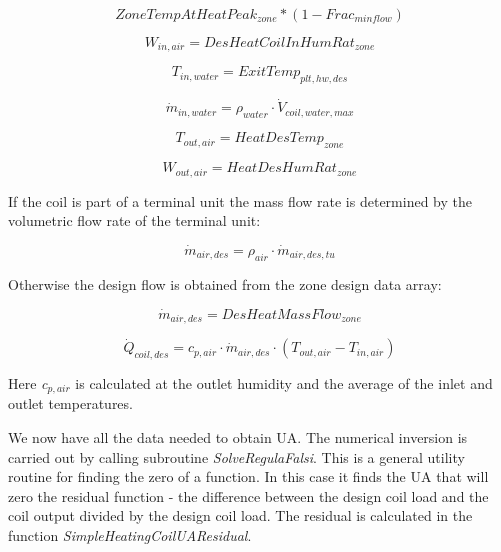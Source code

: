 \begin{equation}
ZoneTempAtHeatPeak_{zone} *(1- Frac_{minflow})
\end{equation}

\begin{equation}
W_{in,air} = DesHeatCoilInHumRat_{zone}
\end{equation}

\begin{equation}
T_{in,water} = ExitTemp_{plt,hw,des}
\end{equation}

\begin{equation}
\dot m_{in,water} = \rho_{water} \cdot \dot V_{coil,water,max}
\end{equation}

\begin{equation}
T_{out,air} = HeatDesTemp_{zone}
\end{equation}

\begin{equation}
W_{out,air} = HeatDesHumRat_{zone}
\end{equation}

If the coil is part of a terminal unit the mass flow rate is determined by the volumetric flow rate of the terminal unit:

\begin{equation}
\dot m_{air,des} = \rho_{air} \cdot \dot m_{air,des,tu}
\end{equation}

Otherwise the design flow is obtained from the zone design data array:

\begin{equation}
\dot m_{air,des} = DesHeatMassFlow_{zone}
\end{equation}

\begin{equation}
\dot Q_{coil,des} = c_{p,air} \cdot \dot m_{air,des} \cdot (T_{out,air} - T_{in,air})
\end{equation}

Here \emph{c\(_{p,air}\)} is calculated at the outlet humidity and the average of the inlet and outlet temperatures.

We now have all the data needed to obtain UA. The numerical inversion is carried out by calling subroutine \emph{SolveRegulaFalsi}. This is a general utility routine for finding the zero of a function. In this case it finds the UA that will zero the residual function - the difference between the design coil load and the coil output divided by the design coil load. The residual is calculated in the function \emph{SimpleHeatingCoilUAResidual}.

